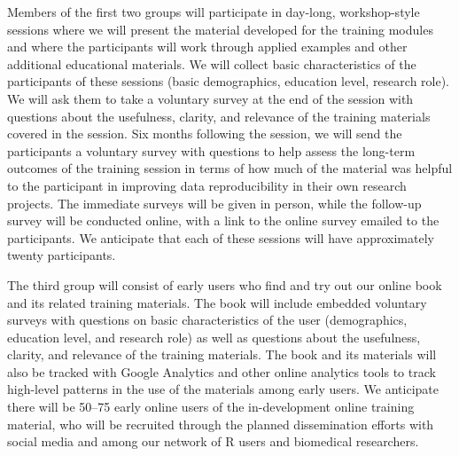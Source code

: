 \documentclass[pdftex,english,11.5pt,parskip=half]{scrartcl}
\begin{document}
Members of the first two groups will participate in day-long, workshop-style sessions
where we will present the material developed for the training modules and where the 
participants will work through applied examples and other additional educational 
materials. We will collect basic characteristics of the participants of these sessions
(basic demographics, education level, research role). We will ask them to take a 
voluntary survey at the end of the session with questions about the usefulness, clarity,
and relevance of the training materials covered in the session. Six months following 
the session, we will send the participants a voluntary survey with questions to help 
assess the long-term outcomes of the training session in terms of how much of the 
material was helpful to the participant in improving data reproducibility in their 
own research projects. The immediate surveys will be given in person, while the 
follow-up survey will be conducted online, with a link to the online survey emailed
to the participants. We anticipate that each of these
sessions will have approximately twenty participants. 

The third group will consist of early users who find and try out our online book and its
related training materials. The book will include embedded voluntary surveys with 
questions on basic characteristics of the user (demographics, education level, and 
research role) as well as questions about the usefulness, clarity,
and relevance of the training materials. The book and its materials will also be 
tracked with Google Analytics and other online analytics tools to track high-level patterns 
in the use of the materials among early users. We anticipate there will be 50--75 early online users of the in-development online training material, who will be recruited through the planned dissemination efforts with social media and among our network of R users and biomedical researchers. 
\end{document}
